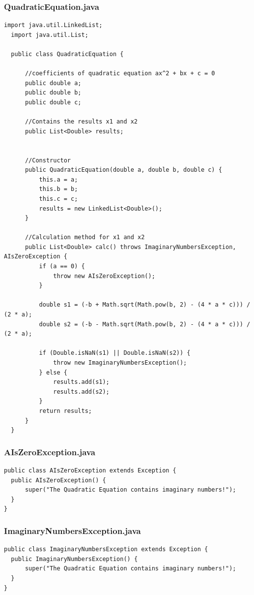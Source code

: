 \documentclass[a4paper,12pt,twoside]{scrreprt}
\begin{document}
\subsubsection{QuadraticEquation.java}
\begin{lstlisting}[basicstyle=\small]
  import java.util.LinkedList;
  import java.util.List;
  
  public class QuadraticEquation {
  
      //coefficients of quadratic equation ax^2 + bx + c = 0
      public double a;
      public double b;
      public double c;
  
      //Contains the results x1 and x2
      public List<Double> results;
  
  
      //Constructor
      public QuadraticEquation(double a, double b, double c) {
          this.a = a;
          this.b = b;
          this.c = c;
          results = new LinkedList<Double>();
      }
  
      //Calculation method for x1 and x2
      public List<Double> calc() throws ImaginaryNumbersException, AIsZeroException {
          if (a == 0) {
              throw new AIsZeroException();
          }
  
          double s1 = (-b + Math.sqrt(Math.pow(b, 2) - (4 * a * c))) / (2 * a);
          double s2 = (-b - Math.sqrt(Math.pow(b, 2) - (4 * a * c))) / (2 * a);
  
          if (Double.isNaN(s1) || Double.isNaN(s2)) {
              throw new ImaginaryNumbersException();
          } else {
              results.add(s1);
              results.add(s2);
          }
          return results;
      }
  }
\end{lstlisting}

\subsubsection{AIsZeroException.java}
\begin{lstlisting}
public class AIsZeroException extends Exception {
  public AIsZeroException() {
      super("The Quadratic Equation contains imaginary numbers!");
  }
}
\end{lstlisting}

\subsubsection{ImaginaryNumbersException.java}
\begin{lstlisting}
public class ImaginaryNumbersException extends Exception {
  public ImaginaryNumbersException() {
      super("The Quadratic Equation contains imaginary numbers!");
  }
}
\end{lstlisting}
\end{document}
